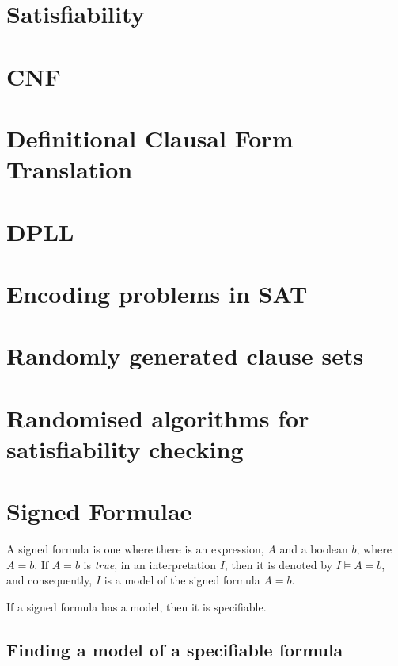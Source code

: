 \section{Satisfiability}

\section{CNF}

\section{Definitional Clausal Form Translation}

\section{DPLL}

\section{Encoding problems in SAT}

\section{Randomly generated clause sets}

\section{Randomised algorithms for satisfiability checking}

\section{Signed Formulae}

A signed formula is one where there is an expression, $A$ and a boolean $b$,
where $A = b$. If $A = b$ is {\it true}, in an interpretation $I$, then it is
denoted by $I \models A = b$, and consequently, $I$ is a model of the signed
formula $A = b$.


If a signed formula has a model, then it is specifiable.

\subsection{Finding a model of a specifiable formula}

